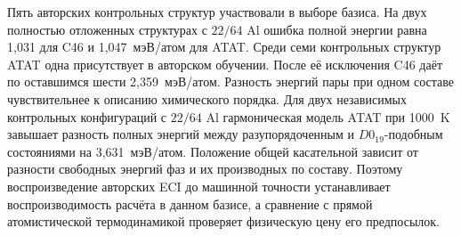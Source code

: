 Пять авторских контрольных структур участвовали в выборе базиса. На
двух полностью отложенных структурах с \(22/64\) Al ошибка полной
энергии равна 1,031 для C46 и 1,047~мэВ/атом для ATAT. Среди семи
контрольных структур ATAT одна присутствует в авторском обучении.
После её исключения C46 даёт по оставшимся шести 2,359~мэВ/атом.
Разность энергий пары при одном составе чувствительнее к описанию
химического порядка. Для двух независимых контрольных конфигураций
с \(22/64\) Al гармоническая модель ATAT при 1000~K завышает разность
полных энергий между разупорядоченным и \(D0_{19}\)-подобным состояниями
на 3,631~мэВ/атом. Положение общей касательной зависит
от разности свободных энергий фаз и их производных по составу.
Поэтому воспроизведение авторских ECI до машинной точности устанавливает
воспроизводимость расчёта в данном базисе, а сравнение с прямой
атомистической термодинамикой проверяет физическую цену его предпосылок.
